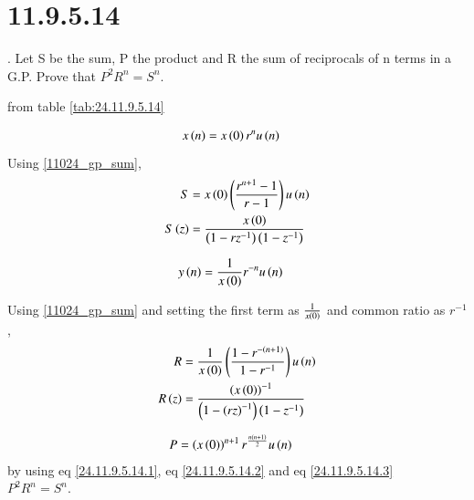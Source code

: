 \documentclass[journal,12pt,twocolumn]{IEEEtran}
\begin{document}


\vspace{3cm}

\title{}
\author{EE23BTECH11024 - G.Karthik Yadav$^{*}$
}
\maketitle
\newpage
\bigskip



\section*{11.9.5.14}
. \hspace{2pt}Let S be the sum, P the product and R the sum of reciprocals of n terms in a G.P.
Prove that $P^2 R^n = S^n$.\\

\solution

from table \ref{tab:24.11.9.5.14}

\begin{align}
    x \left(n\right) & = x\left(0\right)r^{n}u\left(n\right)  
\end{align}    
Using \eqref{11024_gp_sum},
\begin{align}
    S &= x\left(0\right)\left(\frac{r^{n+1}-1}{r-1}\right)u\left(n\right) \label{24.11.9.5.14.1} \\
    S\left(z\right) &= \frac{x\left(0\right)}{\left(1 - rz^{-1}\right)\left(1 - z^{-1}\right)} 
\end{align}

\begin{align}
    y\left(n\right) &= \frac{1}{x\left(0\right)} r^{-n}u\left(n\right)
\end{align}

Using \eqref{11024_gp_sum} and setting the first term as $\frac{1}{x\left(0\right)}$ and common ratio as $r^{-1}$,
\begin{align}
    R &= \frac{1}{x\left(0\right)}\left(\frac{1-r^{-\left(n+1\right)}}{1-r^{-1}}\right)u\left(n\right) \label{24.11.9.5.14.2} \\
    R\left(z\right) &= \frac{\left(x\left(0\right)\right)^{-1}}{\left(1 - \left(rz\right)^{-1}\right)\left(1 - z^{-1}\right)}
\end{align}

\begin{align}
    P &= \left(x\left(0\right)\right)^{n+1} r^{\frac{n\left(n+1\right)}{2}}u\left(n\right) \label{24.11.9.5.14.3}     
\end{align}
by using eq \eqref{24.11.9.5.14.1}, eq \eqref{24.11.9.5.14.2} and eq \eqref{24.11.9.5.14.3} \\
$P^2 R^n = S^n$.
\end{document}
